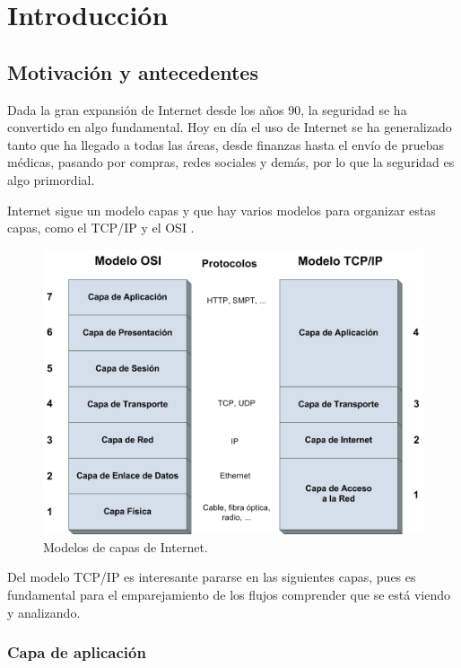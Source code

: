 \chapter{Introducción}


\section{Motivación y antecedentes}

Dada la gran expansión de Internet desde los años 90, la seguridad se ha convertido en algo 
fundamental. Hoy en día el uso de Internet se ha generalizado tanto que ha llegado a todas las áreas, 
desde finanzas hasta el envío de pruebas médicas, pasando por compras, redes sociales y demás, 
por lo que la seguridad es algo primordial.

\intro Internet sigue un modelo capas y que hay varios modelos para organizar estas capas, como 
el TCP/IP y el OSI \cite{redes2010}.

\begin{figure}[H]
  \includegraphics[width=1\textwidth]{imagenes/capas.png}
  \centering
  \caption{Modelos de capas de Internet.}
\end{figure}

Del modelo TCP/IP es interesante pararse en las siguientes capas, pues es fundamental para 
el emparejamiento de los flujos comprender que se está viendo y analizando.

\subsection{Capa de aplicación}


